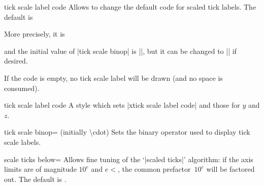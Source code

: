 \begin{pgfplotsxycodekeylist}{\x tick scale label code}
Allows to change the default code for scaled tick labels. The default is
\begin{codeexample}
\end{codeexample}

More precisely, it is
\begin{codeexample}
\end{codeexample}
\noindent and the initial value of |tick scale binop| is |\cdot|, but it can be changed to |\times| if desired.

If the code is empty, no tick scale label will be drawn (and no space is consumed).
\end{pgfplotsxycodekeylist}

\begin{pgfplotscodekey}{tick scale label code}
	A style which sets |xtick scale label code| and those for $y$ and $z$.
\end{pgfplotscodekey}


\begin{pgfplotskey}{tick scale binop= (initially \textbackslash cdot)}
	Sets the binary operator used to display tick scale labels.
\begin{codeexample}[]
\end{codeexample}

\begin{codeexample}[]
\end{codeexample}
\end{pgfplotskey}

\begin{pgfplotskey}{scale ticks below=}
Allows fine tuning of the `|scaled ticks|' algorithm: if the axis limits are of magnitude $10^e$ and $e<$, the common prefactor~$10^e$ will be factored out. The default is 
\makeatletter
\pgfplots@scale@ticks@below@exponent
\makeatother.
\end{pgfplotskey}

